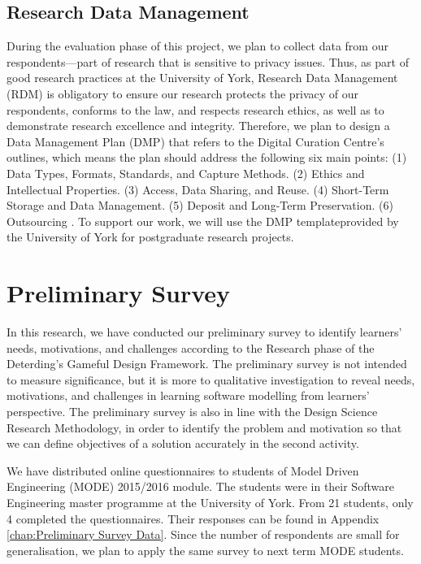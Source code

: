 \documentclass[12pt, a4paper]{report}
\begin{document}
\subsection{Research Data Management}
During the evaluation phase of this project, we plan to collect data from our respondents---part of research that is sensitive to privacy issues. Thus, as part of good research practices at the University of York\footnotemark {}, Research Data Management (RDM) is obligatory to ensure our research protects the privacy of our respondents, conforms to the law, and respects research ethics, as well as to demonstrate research excellence and integrity. Therefore, we plan to design a Data Management Plan (DMP) that refers to the Digital Curation Centre's outlines, which means the plan should address the following six main points: (1) Data Types, Formats, Standards, and Capture Methods. (2) Ethics and Intellectual Properties. (3) Access, Data Sharing, and Reuse. (4) Short-Term Storage and Data Management. (5) Deposit and Long-Term Preservation. (6) Outsourcing \cite{jones2011develop}. To support our work, we will use the DMP template\footnotemark[\value{footnote}] provided by the University of York for postgraduate research projects.



\section{Preliminary Survey}
\label{Preliminary Survey}
In this research, we have conducted our preliminary survey to identify learners' needs, motivations, and challenges according to the Research phase of the Deterding's Gameful Design Framework. The preliminary survey is not intended to measure significance, but it is more to qualitative investigation to reveal needs, motivations, and challenges in learning software modelling from learners' perspective.    The preliminary survey is also in line with the Design Science Research Methodology, in order to identify the problem and motivation so that we can define objectives of a solution accurately in the second activity. 

We have distributed online questionnaires to students of Model Driven
Engineering (MODE) 2015/2016 module. The students were in their Software
Engineering master programme at the University of York. From 21 students, only 4
completed the questionnaires. Their responses can be found in Appendix
\autoref{chap:Preliminary Survey Data}.  Since the number of respondents are
small for generalisation, we plan to apply the same survey to next term MODE
students.
\end{document}
